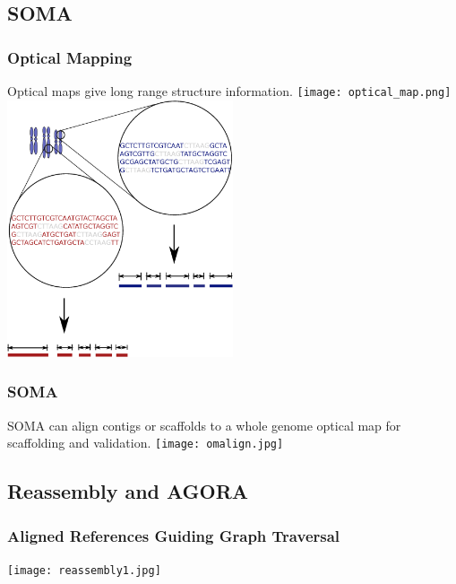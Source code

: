 \documentclass{beamer}
\begin{document}
\subsection{SOMA}
\begin{frame}
\frametitle{Optical Mapping}
Optical maps give long range structure information.
\texttt{[image: optical\_map.png]} 
\includegraphics[width=0.5\textwidth,height=0.8\textheight,keepaspectratio]{ormpub.eps}



% 
\end{frame}
\begin{frame}
\frametitle{SOMA}
SOMA can align contigs or scaffolds to a whole genome optical map for scaffolding and validation.
\texttt{[image: omalign.jpg]}

% 
\end{frame}


\subsection{Reassembly and AGORA}
\begin{frame}
\frametitle{Aligned References Guiding Graph Traversal}
\texttt{[image: reassembly1.jpg]}

% 
\end{frame}
\end{document}
